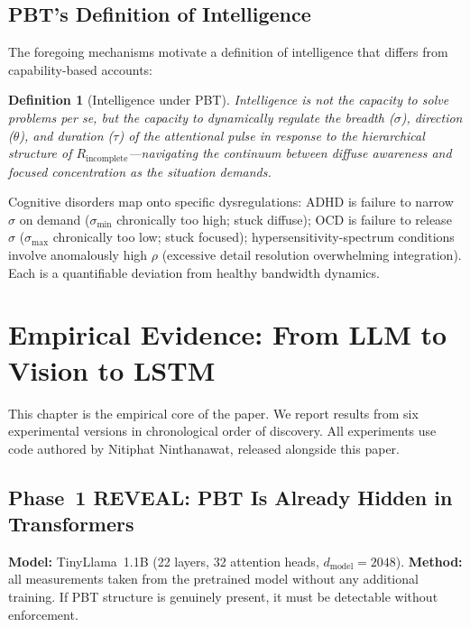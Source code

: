 \documentclass[12pt,a4paper]{article}
\newtheorem{definition}{Definition}[section]
\begin{document}
\subsection{PBT's Definition of Intelligence}

\begin{sloppypar}
The foregoing mechanisms motivate a definition of intelligence
that differs from capability-based accounts:
\end{sloppypar}

\begin{definition}[Intelligence under PBT]
\begin{sloppypar}
Intelligence is not the capacity to solve problems per se, but the
capacity to dynamically regulate the breadth ($\sigma$), direction ($\theta$),
and duration ($\tau$) of the attentional pulse in response to the hierarchical
structure of $R_{\mathrm{incomplete}}$---navigating the continuum between
diffuse awareness and focused concentration as the situation demands.
\end{sloppypar}
\end{definition}

Cognitive disorders map onto specific dysregulations:
ADHD is failure to narrow $\sigma$ on demand
($\sigma_{\min}$ chronically too high; stuck diffuse);
OCD is failure to release $\sigma$
($\sigma_{\max}$ chronically too low; stuck focused);
hypersensitivity-spectrum conditions involve anomalously high $\rho$
(excessive detail resolution overwhelming integration).
Each is a quantifiable deviation from healthy bandwidth dynamics.

\section{Empirical Evidence: From LLM to Vision to LSTM}
\label{sec:empirical}

This chapter is the empirical core of the paper. We report results from six
experimental versions in chronological order of discovery. All experiments use
code authored by Nitiphat Ninthanawat, released alongside this paper.

\subsection{Phase~1 REVEAL: PBT Is Already Hidden in Transformers}

\textbf{Model:} TinyLlama~1.1B (22 layers, 32 attention heads,
$d_{\mathrm{model}} = 2048$). \textbf{Method:} all measurements taken from the
pretrained model without any additional training. If PBT structure is genuinely
present, it must be detectable without enforcement.
\end{document}
